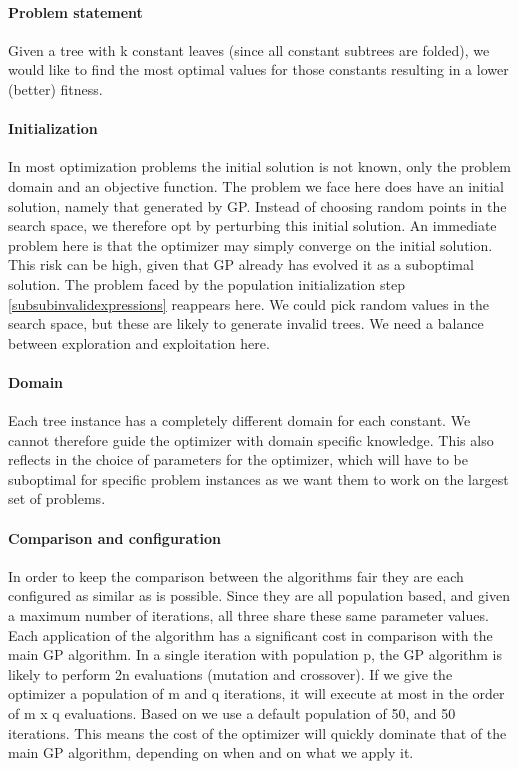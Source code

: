 \paragraph{Problem statement}
Given a tree with k constant leaves (since all constant subtrees are folded), we would like to find the most optimal values for those constants resulting in a lower (better) fitness. 
\paragraph{Initialization}
In most optimization problems the initial solution is not known, only the problem domain and an objective function. The problem we face here does have an initial solution, namely that generated by GP. Instead of choosing random points in the search space, we therefore opt by perturbing this initial solution. An immediate problem here is that the optimizer may simply converge on the initial solution. This risk can be high, given that GP already has evolved it as a suboptimal solution. 
The problem faced by the population initialization step \ref{subsubinvalidexpressions} reappears here. We could pick random values in the search space, but these are likely to generate invalid trees. We need a balance between exploration and exploitation here. 
\paragraph{Domain}
Each tree instance has a completely different domain for each constant. We cannot therefore guide the optimizer with domain specific knowledge. This also reflects in the choice of parameters for the optimizer, which will have to be suboptimal for specific problem instances as we want them to work on the largest set of problems.
\paragraph{Comparison and configuration}
In order to keep the comparison between the algorithms fair they are each configured as similar as is possible. Since they are all population based, and given a maximum number of iterations, all three share these same parameter values. Each application of the algorithm has a significant cost in comparison with the main GP algorithm. In a single iteration with population p, the GP algorithm is likely to perform 2n evaluations (mutation and crossover). If we give the optimizer a population of m and q iterations, it will execute at most in the order of  m x q evaluations. Based on \cite{PSO} we use a default population of 50, and 50 iterations. This means the cost of the optimizer will quickly dominate that of the main GP algorithm, depending on when and on what we apply it.
